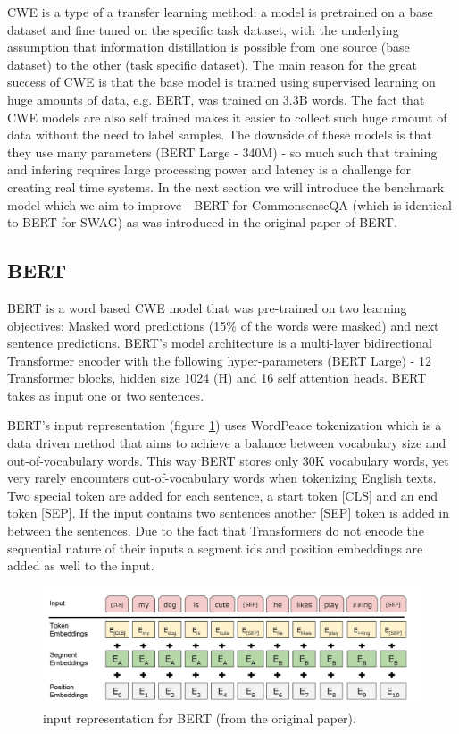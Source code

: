 \documentclass{article}
\begin{document}
CWE is a type of a transfer learning method; a model is pretrained on a base dataset and fine tuned on the specific task dataset,  with the underlying assumption that information distillation is possible from one source (base dataset) to the other (task specific dataset).
The main reason for the great success of CWE is that the base model is trained using supervised learning on huge amounts of data, e.g. BERT, was trained on 3.3B words. The fact that CWE models are also self trained makes it easier to collect such huge amount of data without the need to label samples. The downside of these models is that they use many parameters (BERT Large - 340M) - so much such that training and infering requires large processing power and latency is a challenge for creating real time systems. In the next section we will introduce the benchmark model which we aim to improve - BERT for CommonsenseQA (which is identical to BERT for SWAG) as was introduced in the original paper of BERT.

\subsection{BERT}
BERT is a word based CWE model that was pre-trained on two learning objectives: Masked word predictions (15\% of the words were masked) and next sentence predictions. BERT's model  architecture is a multi-layer bidirectional Transformer encoder \cite{vaswani2017attention} with the following hyper-parameters (BERT Large) - 12 Transformer blocks, hidden size 1024 (H) and 16 self attention heads. BERT takes as input one or two sentences.

BERT's input representation (figure \ref{bert_input_repr}) uses WordPeace \cite{wu2016google} tokenization which is a data driven method that aims to achieve a balance between vocabulary size and out-of-vocabulary words. This way BERT stores only 30K vocabulary words, yet very rarely encounters out-of-vocabulary words when tokenizing English texts. Two special token are added for each sentence, a start token [CLS] and an end token [SEP]. If the input contains two sentences another [SEP] token is added in between the sentences. Due to the fact that Transformers do not encode the sequential nature of their inputs a segment ids and position embeddings are added as well to the input.

\begin{figure}[h!]
\vskip 0.2in
\begin{center}
\centerline{\includegraphics[width=\columnwidth]{bert_input_repr}}
\caption{input representation for BERT (from the original paper).}
\label{bert_input_repr}
\end{center}
\vskip -0.2in
\end{figure}
\end{document}
